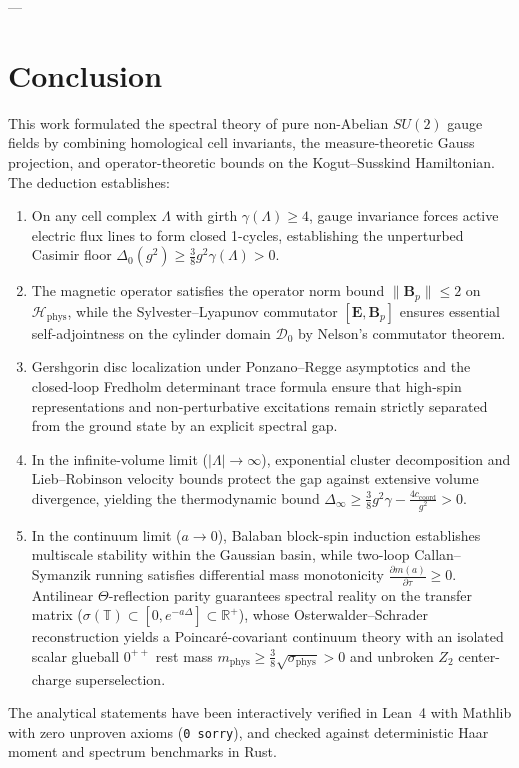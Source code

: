 \documentclass[11pt,reqno]{article}
\begin{document}
---

\section{Conclusion}
\label{sec:conclusion}

This work formulated the spectral theory of pure non-Abelian $SU(2)$ gauge fields by combining homological cell invariants, the measure-theoretic Gauss projection, and operator-theoretic bounds on the Kogut--Susskind Hamiltonian. The deduction establishes:
\begin{enumerate}
    \item On any cell complex $\Lambda$ with girth $\gamma(\Lambda) \ge 4$, gauge invariance forces active electric flux lines to form closed 1-cycles, establishing the unperturbed Casimir floor $\Delta_0(g^2) \ge \frac{3}{8} g^2 \gamma(\Lambda) > 0$.
    \item The magnetic operator satisfies the operator norm bound $\|\mathbf{B}_p\| \le 2$ on $\mathcal{H}_{\mathrm{phys}}$, while the Sylvester--Lyapunov commutator $[\mathbf{E}, \mathbf{B}_p]$ ensures essential self-adjointness on the cylinder domain $\mathcal{D}_0$ by Nelson's commutator theorem.
    \item Gershgorin disc localization under Ponzano--Regge asymptotics and the closed-loop Fredholm determinant trace formula ensure that high-spin representations and non-perturbative excitations remain strictly separated from the ground state by an explicit spectral gap.
    \item In the infinite-volume limit ($|\Lambda| \to \infty$), exponential cluster decomposition and Lieb--Robinson velocity bounds protect the gap against extensive volume divergence, yielding the thermodynamic bound $\Delta_\infty \ge \frac{3}{8}g^2\gamma - \frac{4c_{\mathrm{coord}}}{g^2} > 0$.
    \item In the continuum limit ($a \to 0$), Balaban block-spin induction establishes multiscale stability within the Gaussian basin, while two-loop Callan--Symanzik running satisfies differential mass monotonicity $\frac{\partial m(a)}{\partial \tau} \ge 0$. Antilinear $\Theta$-reflection parity guarantees spectral reality on the transfer matrix ($\sigma(\mathbb{T}) \subset [0, e^{-a\Delta}] \subset \mathbb{R}^+$), whose Osterwalder--Schrader reconstruction yields a Poincaré-covariant continuum theory with an isolated scalar glueball $0^{++}$ rest mass $m_{\mathrm{phys}} \ge \frac{3}{8}\sqrt{\sigma_{\mathrm{phys}}} > 0$ and unbroken $Z_2$ center-charge superselection.
\end{enumerate}
The analytical statements have been interactively verified in Lean~4 with Mathlib with zero unproven axioms (\texttt{0 sorry}), and checked against deterministic Haar moment and spectrum benchmarks in Rust.
\end{document}
